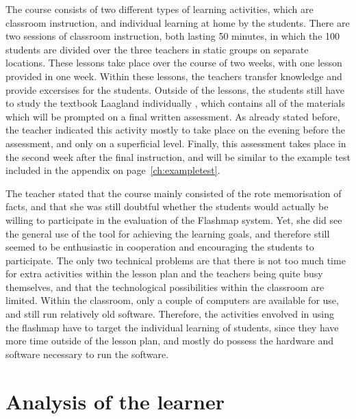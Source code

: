 The course consists of two different types of learning activities, which are classroom instruction, and individual learning at home by the students. There are two sessions of classroom instruction, both lasting 50 minutes, in which the 100 students are divided over the three teachers in static groups on separate locations. These lessons take place over the course of two weeks, with one lesson provided in one week. Within these lessons, the teachers transfer knowledge and provide excersises for the students. Outside of the lessons, the students still have to study the textbook Laagland individually \cite{laagland}, which contains all of the materials which will be prompted on a final written assessment. As already stated before, the teacher indicated this activity mostly to take place on the evening before the assessment, and only on a superficial level. Finally, this assessment takes place in the second week after the final instruction, and will be similar to the example test included in the appendix on page~\ref{ch:exampletest}.

The teacher stated that the course mainly consisted of the rote memorisation of facts, and that she was still doubtful whether the students would actually be willing to participate in the evaluation of the Flashmap system. Yet, she did see the general use of the tool for achieving the learning goals, and therefore still seemed to be enthusiastic in cooperation and encouraging the students to participate. The only two technical problems are that there is not too much time for extra activities within the lesson plan and the teachers being quite busy themselves, and that the technological possibilities within the classroom are limited. Within the classroom, only a couple of computers are available for use, and still run relatively old software. Therefore, the activities envolved in using the flashmap have to target the individual learning of students, since they have more time outside of the lesson plan, and mostly do possess the hardware and software necessary to run the software.

\section{Analysis of the learner}

